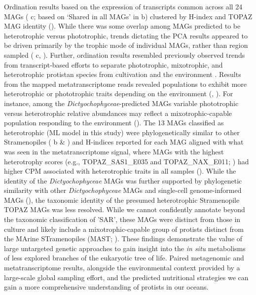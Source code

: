 \documentclass[12pt]{article}
\numberwithin{equation}{section}
\begin{document}
Ordination results based on the expression of transcripts common across all 24 MAGs ( c; based on ‘Shared in all MAGs’ in b) clustered by H-index and TOPAZ MAG identity (). While there was some overlap among MAGs predicted to be heterotrophic versus phototrophic, trends dictating the PCA results appeared to be driven primarily by the trophic mode of individual MAGs, rather than region sampled ( c, ). Further, ordination results resembled previously observed trends from transcript-based efforts to separate phototrophic, mixotrophic, and heterotrophic protistan species from cultivation \citep{koid2014po, beisser2017p} and the environment \citep{hu2018}. Results from the mapped metatranscriptome reads revealed populations to exhibit more heterotrophic or phototrophic traits depending on the environment (, ). For instance, among the \textit{Dictyochophyceae}-predicted MAGs variable phototrophic versus heterotrophic relative abundances may reflect a mixotrophic-capable population responding to the environment (). The 13 MAGs classified as heterotrophic (ML model in this study) were phylogenetically similar to  other Stramenopiles ( b \& ) and H-indices reported for each MAG aligned with what was seen in the metatranscriptome signal, where MAGs with the highest heterotrophy scores (e.g., TOPAZ\_SAS1\_E035 and TOPAZ\_NAX\_E011; ) had higher CPM associated with heterotrophic traits in all samples (). While the identity of the \textit{Dictyochophyceae} MAGs was further supported by phylogenetic similarity with other \textit{Dictyochophyceae} MAGs and single-cell genome-informed MAGs (), the taxonomic identity of the presumed heterotrophic Stramenopile TOPAZ MAGs was less resolved. While we cannot confidently annotate beyond the taxonomic classification of 'SAR', these MAGs were distinct from those in culture and likely include a mixotrophic-capable group of protists distinct from the MArine STramenopiles (MAST; ). These findings demonstrate the value of large untargeted genetic approaches to gain insight into the \textit{in situ} metabolisms of less explored branches of the eukaryotic tree of life. Paired metagenomic and metatranscriptome results, alongside the environmental context provided by a large-scale global sampling effort, and the predicted nutritional strategies we can gain a more comprehensive understanding of protists in our oceans.
\end{document}
